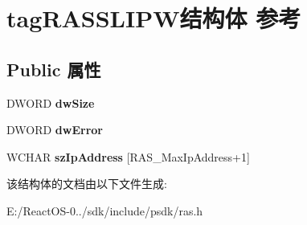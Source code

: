\hypertarget{structtag_r_a_s_s_l_i_p_w}{}\section{tag\+R\+A\+S\+S\+L\+I\+P\+W结构体 参考}
\label{structtag_r_a_s_s_l_i_p_w}
\subsection*{Public 属性}
\begin{DoxyCompactItemize}
\item 
\mbox{\label{structtag_r_a_s_s_l_i_p_w_a35ffb6e9572b5a1bd31915843059311f}} 
D\+W\+O\+RD {\bfseries dw\+Size}
\item 
\mbox{\label{structtag_r_a_s_s_l_i_p_w_ad074ac513d0c589db79a8c0f69eefc78}} 
D\+W\+O\+RD {\bfseries dw\+Error}
\item 
\mbox{\label{structtag_r_a_s_s_l_i_p_w_a5900ecee71a6ae01eea3f973f94e4b3f}} 
W\+C\+H\+AR {\bfseries sz\+Ip\+Address} \mbox{[}R\+A\+S\+\_\+\+Max\+Ip\+Address+1\mbox{]}
\end{DoxyCompactItemize}


该结构体的文档由以下文件生成\+:\begin{DoxyCompactItemize}
\item 
E\+:/\+React\+O\+S-\/0../sdk/include/psdk/ras.\+h\end{DoxyCompactItemize}
